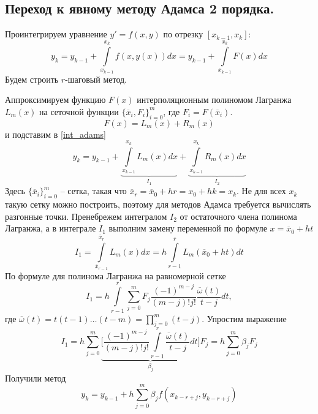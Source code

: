 \documentclass[a4paper, 12pt]{article}
\theoremstyle{mythm}
\begin{document}
	\subsection{Переход к явному методу Адамса 2 порядка.}
	
	Проинтегрируем уравнение $y'=f(x,y)$ по отрезку $[x_{k-1}, x_k]$:
	\begin{equation} \label{int_adams}
		y_k=y_{k-1}+\int\limits_{x_{k-1}}^{x_k}f(x,y(x))dx=y_{k-1}+\int\limits_{x_{k-1}}^{x_k}F(x)dx
	\end{equation}
	Будем строить $r$-шаговый метод.
	
	Аппроксимируем функцию $F(x)$ интерполяционным полиномом Лагранжа $L_m(x)$ на сеточной функции $\{\overline{x}_i, F_i\}_{i=0}^m$, где $F_i= F(\overline{x}_i)$.
	\begin{equation}
		F(x) = L_m(x) + R_m(x)
	\end{equation} 
	и подставим в \eqref{int_adams}
	\begin{equation}
		y_k=y_{k-1}+\underbrace{\int\limits_{x_{k-1}}^{x_k}L_m(x)dx}_{I_1} + \underbrace{\int\limits_{x_{k-1}}^{x_k}R_m(x)dx}_{I_2}
	\end{equation}
	Здесь $\{\overline{x}_i\}_{i=0}^m$ -- сетка, такая что $\overline{x}_r=\overline{x}_0+hr=x_0+hk=x_k$. Не для всех $x_k$ такую сетку можно построить, поэтому для методов Адамса требуется вычислять разгонные точки.
	Пренебрежем интегралом $I_2$ от остаточного члена полинома Лагранжа, а в интеграле $I_1$ выполним замену переменной по формуле $x=\overline{x}_0+ht$
	\begin{equation}
		I_1=\int\limits_{\overline{x}_{r-1}}^{\overline{x}_r}L_m(x)dx=h\int\limits_{r-1}^{r}L_m(\overline{x}_0+ht)dt
	\end{equation}
	По формуле для полинома Лагранжа на равномерной сетке
	\begin{equation}
		I_1=h\int\limits_{r-1}^{r}\sum\limits_{j=0}^mF_j\frac{(-1)^{m-j}}{(m-j)!j!}\frac{\overline{\omega}(t)}{t-j}dt,
	\end{equation}
	где $\displaystyle \overline{\omega}(t)=t(t-1)\dots(t-m)=\prod\limits_{j=0}^m(t-j)$. Упростим выражение
	\begin{equation}
		I_1=h\sum\limits_{j=0}^m\underbrace{\bigg[\frac{(-1)^{m-j}}{(m-j)!j!}\int\limits_{r-1}^r\frac{\overline{\omega}(t)}{t-j}dt\bigg]}_{\beta_j}F_j=h\sum\limits_{j=0}^m\beta_{j}F_j
	\end{equation}
	Получили метод
	\begin{equation}
		y_{k}=y_{k-1}+h\sum\limits_{j=0}^m\beta_jf(x_{k-r+j}, y_{k-r+j})
	\end{equation}
\end{document}
